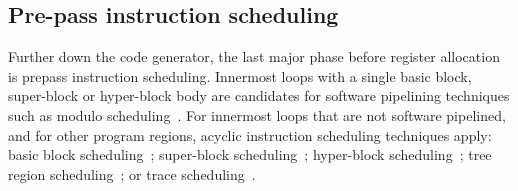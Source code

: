 \subsection{Pre-pass instruction scheduling}

Further down the code generator, the last major phase before register allocation
is prepass instruction scheduling. Innermost loops with a single basic block,
super-block or hyper-block body are candidates for software pipelining
techniques such as modulo scheduling~\cite{Rau:1996:IJPP}. For innermost loops
that are not software pipelined, and for other program regions, acyclic
instruction scheduling techniques apply: basic block scheduling~\cite{Goodman:1988:ICS}; super-block scheduling~\cite{Hwu:1993:JS}; hyper-block
scheduling~\cite{Mahlke:1992:MICRO}; tree region scheduling~\cite{Havanki:1998:HPCA}; or trace scheduling~\cite{Lowney:1993:JS}.

